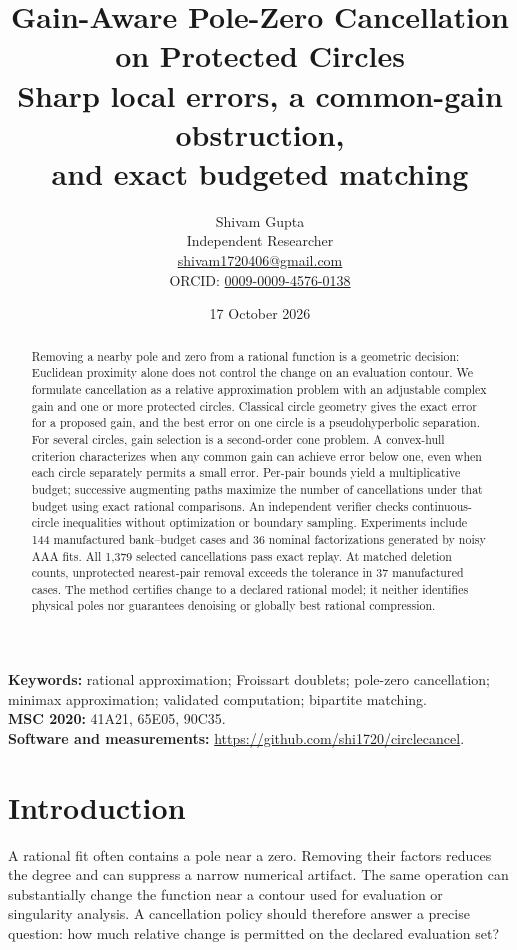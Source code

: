 \documentclass[11pt]{article}
\title{Gain-Aware Pole-Zero Cancellation\\on Protected Circles\\[4pt]\large Sharp local errors, a common-gain obstruction,\\and exact budgeted matching}
\author{Shivam Gupta\\\small Independent Researcher\\\small \href{mailto:shivam1720406@gmail.com}{shivam1720406@gmail.com}\\\small ORCID: \href{https://orcid.org/0009-0009-4576-0138}{0009-0009-4576-0138}}
\date{17 October 2026}
\theoremstyle{definition}\newtheorem{definition}[theorem]{Definition}
\begin{document}
\maketitle
\begin{abstract}
Removing a nearby pole and zero from a rational function is a geometric decision: Euclidean proximity alone does not control the change on an evaluation contour. We formulate cancellation as a relative approximation problem with an adjustable complex gain and one or more protected circles. Classical circle geometry gives the exact error for a proposed gain, and the best error on one circle is a pseudohyperbolic separation. For several circles, gain selection is a second-order cone problem. A convex-hull criterion characterizes when any common gain can achieve error below one, even when each circle separately permits a small error. Per-pair bounds yield a multiplicative budget; successive augmenting paths maximize the number of cancellations under that budget using exact rational comparisons. An independent verifier checks continuous-circle inequalities without optimization or boundary sampling. Experiments include 144 manufactured bank--budget cases and 36 nominal factorizations generated by noisy AAA fits. All 1,379 selected cancellations pass exact replay. At matched deletion counts, unprotected nearest-pair removal exceeds the tolerance in 37 manufactured cases. The method certifies change to a declared rational model; it neither identifies physical poles nor guarantees denoising or globally best rational compression.
\end{abstract}
\noindent\textbf{Keywords:} rational approximation; Froissart doublets; pole-zero cancellation; minimax approximation; validated computation; bipartite matching.\\
\textbf{MSC 2020:} 41A21, 65E05, 90C35.\\
\textbf{Software and measurements:} \url{https://github.com/shi1720/circlecancel}.

\section{Introduction}
A rational fit often contains a pole near a zero. Removing their factors reduces the degree and can suppress a narrow numerical artifact. The same operation can substantially change the function near a contour used for evaluation or singularity analysis. A cancellation policy should therefore answer a precise question: how much relative change is permitted on the declared evaluation set?
\end{document}
